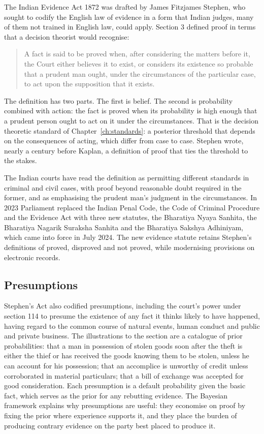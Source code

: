 The Indian Evidence Act 1872 was drafted by James Fitzjames Stephen, who sought to codify the English law of evidence in a form that Indian judges, many of them not trained in English law, could apply. Section 3 defined proof in terms that a decision theorist would recognise:
\begin{quote}
A fact is said to be proved when, after considering the matters before it, the Court either believes it to exist, or considers its existence so probable that a prudent man ought, under the circumstances of the particular case, to act upon the supposition that it exists.
\end{quote}
The definition has two parts. The first is belief. The second is probability combined with action: the fact is proved when its probability is high enough that a prudent person ought to act on it under the circumstances. That is the decision theoretic standard of Chapter~\ref{ch:standards}: a posterior threshold that depends on the consequences of acting, which differ from case to case. Stephen wrote, nearly a century before Kaplan, a definition of proof that ties the threshold to the stakes.

The Indian courts have read the definition as permitting different standards in criminal and civil cases, with proof beyond reasonable doubt required in the former, and as emphasising the prudent man's judgment in the circumstances. In 2023 Parliament replaced the Indian Penal Code, the Code of Criminal Procedure and the Evidence Act with three new statutes, the Bharatiya Nyaya Sanhita, the Bharatiya Nagarik Suraksha Sanhita and the Bharatiya Sakshya Adhiniyam, which came into force in July 2024. The new evidence statute retains Stephen's definitions of proved, disproved and not proved, while modernising provisions on electronic records.

\subsection{Presumptions}

Stephen's Act also codified presumptions, including the court's power under section 114 to presume the existence of any fact it thinks likely to have happened, having regard to the common course of natural events, human conduct and public and private business. The illustrations to the section are a catalogue of prior probabilities: that a man in possession of stolen goods soon after the theft is either the thief or has received the goods knowing them to be stolen, unless he can account for his possession; that an accomplice is unworthy of credit unless corroborated in material particulars; that a bill of exchange was accepted for good consideration. Each presumption is a default probability given the basic fact, which serves as the prior for any rebutting evidence. The Bayesian framework explains why presumptions are useful: they economise on proof by fixing the prior where experience supports it, and they place the burden of producing contrary evidence on the party best placed to produce it.

